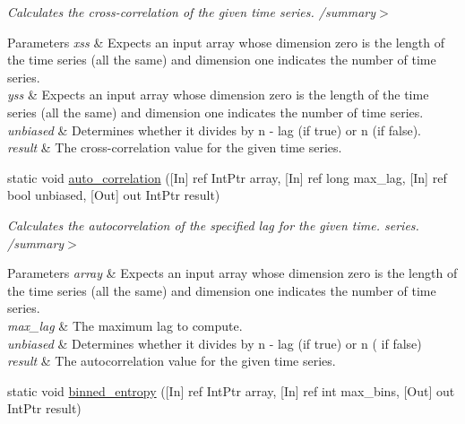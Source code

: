 \begin{DoxyCompactItemize}
\begin{DoxyCompactList}\small\item\em Calculates the cross-\/correlation of the given time series. /summary$>$ 
\begin{DoxyParams}{Parameters}
{\em xss} & Expects an input array whose dimension zero is the length of the time series (all the same) and dimension one indicates the number of time series.\\
\hline
{\em yss} & Expects an input array whose dimension zero is the length of the time series (all the same) and dimension one indicates the number of time series.\\
\hline
{\em unbiased} & Determines whether it divides by n -\/ lag (if true) or n (if false).\\
\hline
{\em result} & The cross-\/correlation value for the given time series.\\
\hline
\end{DoxyParams}
\end{DoxyCompactList}\item 
static void \mbox{\hyperlink{classkhiva_1_1interop_1_1_d_l_l_features_a2c3bffd96676d0b5985f4778182dcc1c}{auto\+\_\+correlation}} (\mbox{[}In\mbox{]} ref Int\+Ptr array, \mbox{[}In\mbox{]} ref long max\+\_\+lag, \mbox{[}In\mbox{]} ref bool unbiased, \mbox{[}Out\mbox{]} out Int\+Ptr result)
\begin{DoxyCompactList}\small\item\em Calculates the autocorrelation of the specified lag for the given time. series. /summary$>$ 
\begin{DoxyParams}{Parameters}
{\em array} & Expects an input array whose dimension zero is the length of the time series (all the same) and dimension one indicates the number of time series.\\
\hline
{\em max\+\_\+lag} & The maximum lag to compute.\\
\hline
{\em unbiased} & Determines whether it divides by n -\/ lag (if true) or n ( if false)\\
\hline
{\em result} & The autocorrelation value for the given time series.\\
\hline
\end{DoxyParams}
\end{DoxyCompactList}\item 
static void \mbox{\hyperlink{classkhiva_1_1interop_1_1_d_l_l_features_a5e37b3513e5a00aee63db348fae291c9}{binned\+\_\+entropy}} (\mbox{[}In\mbox{]} ref Int\+Ptr array, \mbox{[}In\mbox{]} ref int max\+\_\+bins, \mbox{[}Out\mbox{]} out Int\+Ptr result)

\end{DoxyCompactItemize}
